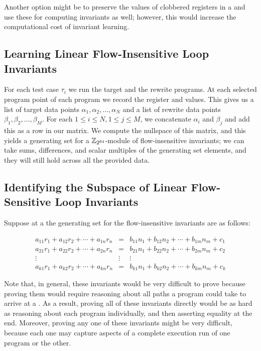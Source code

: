 Another option might be to preserve the values of
clobbered registers in a \shadow{} and use these for computing
invariants as well; however, this would increase the computational
cost of invariant learning.

\subsection{Learning Linear Flow-Insensitive Loop Invariants} \label{algstep2}

For each test case $\tau_i$ we run the target and the rewrite
programs. At each selected program point of each program we record the
register and \shadow{} values. This gives us a list of target data
points $\alpha_1, \alpha_2, \dotsc, \alpha_N$ and a list of rewrite
data points $\beta_1, \beta_2, \dotsc, \beta_M$. For each $1 \leq i
\leq N, 1 \leq j \leq M$, we concatenate $\alpha_i$ and $\beta_j$
and add this as a row in our matrix. We compute the nullspace of
this matrix, and this yields a generating set for a $\mathbb{Z}_{2^{64}}$-module of
flow-insensitive invariants; we can take sums, differences, and scalar
multiples of the generating set elements, and they will still hold across all
the provided data.

\subsection{Identifying the Subspace of Linear Flow-Sensitive Loop Invariants} \label{algstep3}

Suppose at a \cutpoint{} the generating set for the flow-insensitive invariants are as follows:

\begin{eqnarray*}
a_{11}r_1 + a_{12}r_2 + \dotsm + a_{1n}r_n &=& b_{11}n_1 + b_{12}n_2 + \dotsm + b_{1m}n_m + c_1\\
a_{21}r_1 + a_{22}r_2 + \dotsm + a_{2n}r_n &=& b_{21}n_1 + b_{22}n_2 + \dotsm + b_{2m}n_m + c_2\\
\vdots &\vdots& \vdots\\
a_{k1}r_1 + a_{k2}r_2 + \dotsm + a_{kn}r_n &=& b_{k1}n_1 + b_{k2}n_2 + \dotsm + b_{km}n_m + c_k
\end{eqnarray*}

Note that, in general, these invariants would be very difficult to
prove because proving them would require reasoning about all paths
a program could take to arrive at a \cutpoint. As a result, proving
all of these invariants directly would be as hard as reasoning about
each program individually, and then asserting equality at the end.
Moreover, proving any one of these invariants might be very difficult,
because each one may capture aspects of a complete execution run of
one program or the other. 

